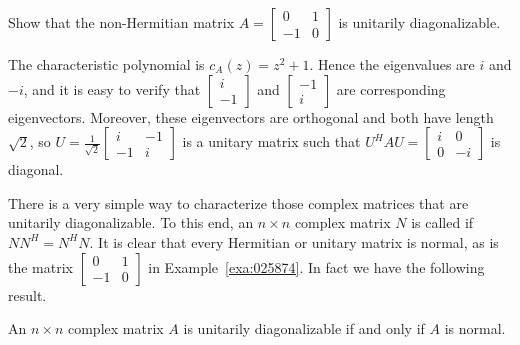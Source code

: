 \documentclass{ximera}
\begin{document}
\begin{example}\label{exa:025874}
Show that the non-Hermitian matrix $A = \left[ \begin{array}{rr}
0 & 1 \\
-1 & 0
\end{array}\right]$ is unitarily diagonalizable.


\begin{explanation}
  The characteristic polynomial is $c_{A}(z) = z^{2} + 1$. Hence the eigenvalues are $i$ and $-i$, and it is easy to verify that $\left[ \begin{array}{r}
  i \\
  -1
  \end{array}\right]$ and $\left[ \begin{array}{r}
  -1 \\
  i
  \end{array}\right]$ are corresponding eigenvectors. Moreover, these eigenvectors are orthogonal and both have length $\sqrt{2}$, so $U = \frac{1}{\sqrt{2}}\left[ \begin{array}{rr}
  i & -1 \\
  -1 & i
  \end{array}\right]$ is a unitary matrix such that $U^HAU = \left[ \begin{array}{rr}
  i & 0 \\
  0 & -i
  \end{array}\right]$ is diagonal.
\end{explanation}
\end{example}

There is a very simple way to characterize those complex matrices that are unitarily diagonalizable. To this end, an $n \times n$ complex matrix $N$ is called  if $NN^{H} = N^{H}N$. It is clear that every Hermitian or unitary matrix is normal, as is the matrix $\left[ \begin{array}{rr}
	0 & 1 \\
	-1 & 0
\end{array}\right]$ in Example~\ref{exa:025874}. In fact we have the following result.

\begin{theorem}\label{th:025890}
An $n \times n$ complex matrix $A$ is unitarily diagonalizable if and only if $A$ is normal.
\end{theorem}
\end{document}
